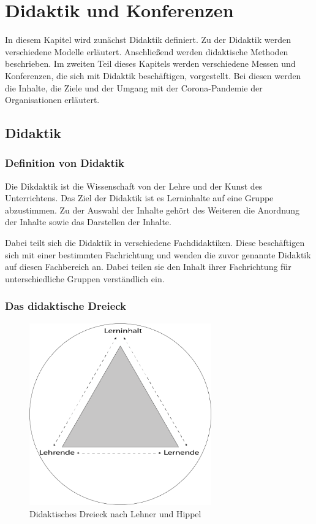 \chapter{Didaktik und Konferenzen}

In diesem Kapitel wird zunächst Didaktik definiert. Zu der Didaktik werden verschiedene Modelle erläutert. Anschließend werden didaktische Methoden beschrieben. Im zweiten Teil dieses Kapitels werden verschiedene Messen und Konferenzen, die sich mit Didaktik beschäftigen, vorgestellt. Bei diesen werden die Inhalte, die Ziele und der Umgang mit der Corona-Pandemie der Organisationen erläutert.

\section{Didaktik}
 

\subsection{Definition von Didaktik} 

Die Dikdaktik ist die Wissenschaft von der Lehre und der Kunst des Unterrichtens. Das Ziel der Didaktik ist es Lerninhalte auf eine Gruppe abzustimmen. Zu der Auswahl der Inhalte gehört des Weiteren die Anordnung der Inhalte sowie das Darstellen der Inhalte. \autocite[Vgl.][]{Lehner.2019} 

Dabei teilt sich die Didaktik in verschiedene Fachdidaktiken. Diese beschäftigen sich mit einer bestimmten Fachrichtung und wenden die zuvor genannte Didaktik auf diesen Fachbereich an. Dabei teilen sie den Inhalt ihrer Fachrichtung für unterschiedliche Gruppen verständlich ein. \autocite[Vgl.][S. 15]{Lehner.2019} 

\subsection{Das didaktische Dreieck}

\begin{figure}[h]
    \centering
    \includegraphics[width=0.7\textwidth]{img/Didaktisches_Dreieck.png}
    \caption[Grafik: Didaktisches Dreieck]{Didaktisches Dreieck nach Lehner und Hippel}
    \label{fig: Didaktisches Dreieck}
\end{figure}

